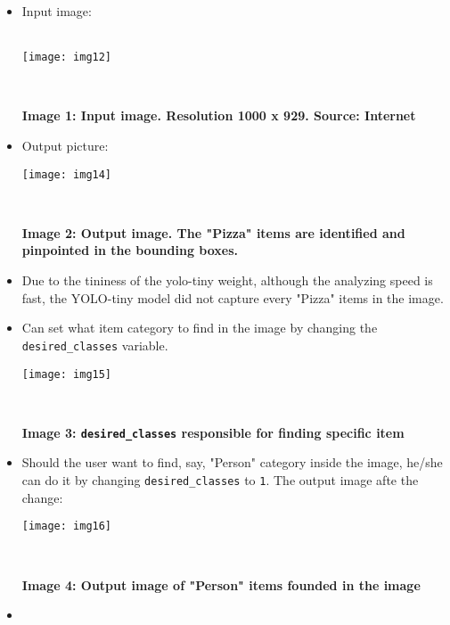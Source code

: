 \documentclass{article}
\newcommand{\code}[1]{\texttt{#1}}
\begin{document}
\begin{itemize}
	\item Input image:\\\\ \centerline{\texttt{[image: img12]}} \\
	\centerline{\small{\textbf{Image 1: Input image. Resolution 1000 x 929. Source: Internet}}}
	\item Output picture:\\
	\centerline{\texttt{[image: img14]}}\\
	\centerline{\small{\textbf{Image 2: Output image. The "Pizza" items are identified and pinpointed in the bounding boxes.}}}
	\item Due to the tininess of the yolo-tiny weight, although the analyzing speed is fast, the YOLO-tiny model did not capture every "Pizza" items in the image.
	\item Can set what item category to find in the image by changing the \code{desired\_classes} variable.\\
	\centerline{\texttt{[image: img15]}}\\
	\centerline{\small{\textbf{Image 3: \code{desired\_classes} responsible for finding specific item}}}
	\item Should the user want to find, say, "Person" category inside the image, he/she can do it by changing \code{desired\_classes} to \code{1}. The output image afte the change:\\
	\centerline{\texttt{[image: img16]}}\\
	\centerline{\small{\textbf{Image 4: Output image of "Person" items founded in the image}}}
	\item
\end{itemize}
	
\end{document}
